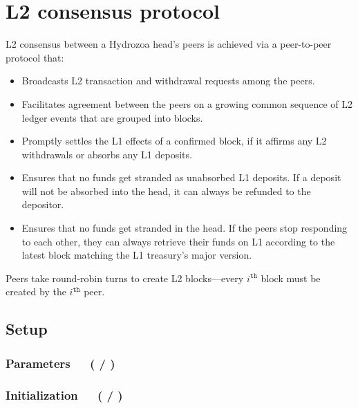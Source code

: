 \documentclass[../hydrozoa.tex]{subfiles}
\begin{document}
\chapter{L2 consensus protocol}%
\label{h:l2-consensus-protocol}%

L2 consensus between a Hydrozoa head's peers is achieved via a peer-to-peer protocol that:
\begin{itemize}
  \item Broadcasts L2 transaction and withdrawal requests among the peers.
  \item Facilitates agreement between the peers on a growing common sequence of L2 ledger events that are grouped into blocks.
  \item Promptly settles the L1 effects of a confirmed block, if it affirms any L2 withdrawals or absorbs any L1 deposits.
  \item Ensures that no funds get stranded as unabsorbed L1 deposits. If a deposit will not be absorbed into the head, it can always be refunded to the depositor.
  \item Ensures that no funds get stranded in the head. If the peers stop responding to each other, they can always retrieve their funds on L1 according to the latest block matching the L1 treasury's major version.
\end{itemize}

Peers take round-robin turns to create L2 blocks---every $i^\mathtt{th}$ block must be created by the  $i^\mathtt{th}$ peer.

\section{Setup}%
\label{h:l2-consensus-setup}%

\subsection{Parameters~~~( / )}%
\label{h:l2-consensus-parameters}%




\subsection{Initialization~~~( / )}%
\label{h:l2-consensus-intitialization}%
\end{document}
